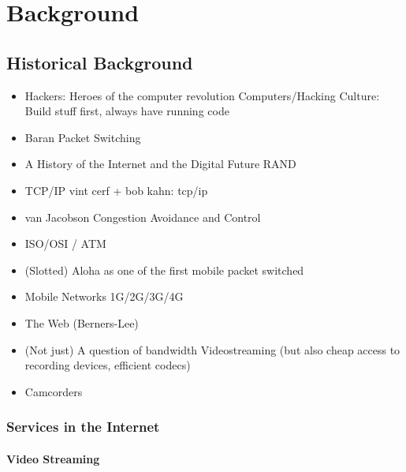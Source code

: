 \chapter{Background}
\label{chap:relatedwork}


\section{Historical Background}

\begin{itemize}
\item Hackers: Heroes of the computer revolution \cite{levy2010hackers}
		Computers/Hacking Culture: Build stuff first, always have running code
\item Baran Packet Switching
\item A History of the Internet and the Digital Future \cite{ryan2010history}
		RAND
\item TCP/IP vint cerf + bob kahn: tcp/ip \cite{1092259}
\item van Jacobson Congestion Avoidance and Control \cite{Jacobson:1995:CAC:205447.205462}
\item ISO/OSI / ATM
\item (Slotted) Aloha as one of the first mobile packet switched
\item Mobile Networks 1G/2G/3G/4G
\item The Web (Berners-Lee)
\item (Not just) A question of bandwidth Videostreaming (but also cheap access to recording devices, efficient codecs)
\item Camcorders

\end{itemize}


\subsection{Services in the Internet}

\subsubsection{Video Streaming}

